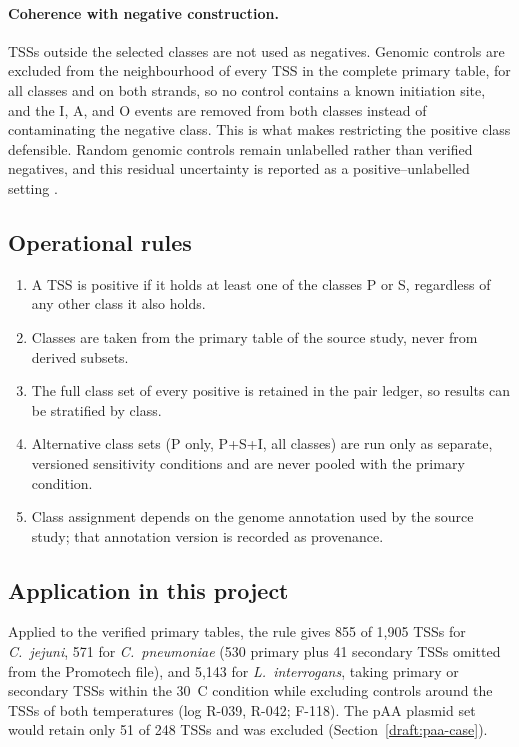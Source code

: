 \paragraph{Coherence with negative construction.}
TSSs outside the selected classes are not used as negatives. Genomic controls
are excluded from the neighbourhood of every TSS in the complete primary table,
for all classes and on both strands, so no control contains a known initiation
site, and the I, A, and O events are removed from both classes instead of
contaminating the negative class. This is what makes restricting the positive
class defensible. Random genomic controls remain unlabelled rather than
verified negatives, and this residual uncertainty is reported as a
positive--unlabelled setting \citep{elkan2008pu}.

\subsection{Operational rules}

\begin{enumerate}
  \item A TSS is positive if it holds at least one of the classes P or S,
    regardless of any other class it also holds.
  \item Classes are taken from the primary table of the source study, never
    from derived subsets.
  \item The full class set of every positive is retained in the pair ledger,
    so results can be stratified by class.
  \item Alternative class sets (P only, P+S+I, all classes) are run only as
    separate, versioned sensitivity conditions and are never pooled with the
    primary condition.
  \item Class assignment depends on the genome annotation used by the source
    study; that annotation version is recorded as provenance.
\end{enumerate}

\subsection{Application in this project}

Applied to the verified primary tables, the rule gives 855 of 1,905 TSSs for
\textit{C.~jejuni}, 571 for \textit{C.~pneumoniae} (530 primary plus 41
secondary TSSs omitted from the Promotech file), and 5,143 for
\textit{L.~interrogans}, taking primary or secondary TSSs within the 30~\textdegree C
condition while excluding controls around the TSSs of both temperatures (log
R-039, R-042; F-118). The pAA plasmid set would retain only 51 of 248 TSSs and
was excluded (Section~\ref{draft:paa-case}).

